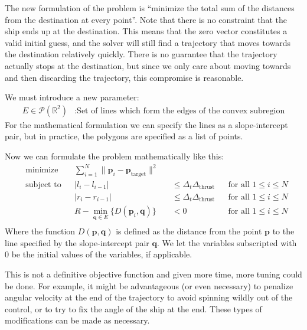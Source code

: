 \documentclass{report}
\begin{document}
The new formulation of the problem is ``minimize the total sum of the distances from the destination at
every point''. Note that there is no constraint that the ship ends up at the destination. This means that the
zero vector constitutes a valid initial guess, and the solver will still find a trajectory that moves towards the
destination relatively quickly. There is no guarantee that the trajectory actually stops at the destination, but
since we only care about moving towards and then discarding the trajectory, this compromise is reasonable.

We must introduce a new parameter:
\begin{align*}
    E \in \mathcal{P}(\mathbb{R}^2) &: \text{Set of lines which form the edges of the convex subregion}
\end{align*}
For the mathematical formulation we can specify the lines as a slope-intercept pair, but in practice, the polygons
are specified as a list of points.

Now we can formulate the problem mathematically like this:
\begin{equation*}
\begin{aligned}
& \text{minimize}
& & \sum_{i=1}^N \| \mathbf{p}_i - \mathbf{p}_\text{target} \|^2\\
& \text{subject to}
&& \lvert l_{i} - l_{i-1} \rvert &&\leq \Delta_t \Delta_\text{thrust} && \text{for all $1 \leq i \leq N$} \\
& && \lvert r_{i} - r_{i-1} \rvert &&\leq \Delta_t \Delta_\text{thrust} && \text{for all $1 \leq i \leq N$} \\
& && R - \min_{\mathbf{q} \in E} \{ D(\mathbf{p}_i, \mathbf{q}) \} &&< 0 && \text{for all $1 \leq i \leq N$} \\
\end{aligned}
\end{equation*}
Where the function $D(\mathbf{p}, \mathbf{q})$ is defined as the distance from the point $\mathbf{p}$ to the line
specified by the slope-intercept pair $\mathbf{q}$. We let the variables subscripted with $0$ be the initial
values of the variables, if applicable.

This is not a definitive objective function and given more time, more tuning could be done. For example,
it might be advantageous (or even necessary) to penalize angular velocity at the end of the trajectory to 
avoid spinning wildly out of the control, or to try to fix the angle of the ship at the end.
These types of modifications can be made as necessary.
\end{document}
